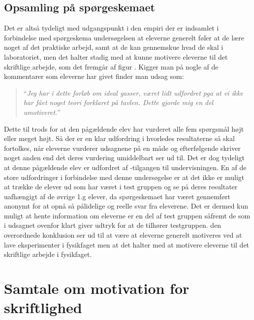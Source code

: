 \subsection*{Opsamling på spørgeskemaet}
Det er altså tydeligt med udgangspunkt i den empiri der er indsamlet i forbindelse med spørgeskema undersøgelsen at eleverne generelt føler at de lære noget af det praktiske arbejd, samt at de kan gennemskue hvad de skal i laboratoriet, men det halter stadig med at kunne motivere eleverne til det skriftlige arbejde, som det fremgår af figur .
Kigger man på nogle af de kommentarer som eleverne har givet finder man udsag som:
\begin{quote}
	``\emph{Jeg har i dette forløb om ideal gasser, været lidt udfordret pga at vi ikke har fået noget teori forklaret på tavlen. Dette gjorde mig en del umotiveret.}''
\end{quote}
Dette til trods for at den pågældende elev har vurderet alle fem spørgsmål højt eller meget højt. Så der er en klar udfordring i hvorledes resultaterne så skal fortolkes, når eleverne vurderer udsagnene på en måde og efterfølgende skriver noget anden end det deres vurdering umiddelbart ser ud til. Det er dog tydeligt at denne pågældende elev er udfordret af \ib{}-tilgangen til undervisningen.
En af de store udfordringer i forbindelse med denne undersøgelse er at det ikke er muligt at trække de elever ud som har været i test gruppen og se på deres resultater uafhængigt af de øvrige 1.g elever, da spørgeskemaet har været gennemført anonymt for at opnå så pålidelige og reelle svar fra eleverene. Det er dermed kun muligt at hente information om eleverne er en del af test gruppen såfremt de som i udsagnet ovenfor klart giver udtryk for at de tilhører testgruppen. den overordnede konklusion ser ud til at være at eleverne generelt motiveres ved at lave eksperimenter i fysikfaget men at det halter med at motivere eleverne til det skriftlige arbejde i fysikfaget.  

\section{Samtale om motivation for skriftlighed}
\label{sec:sam}


